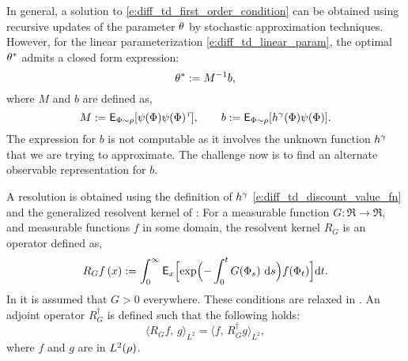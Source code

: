 In general, a solution to \eqref{e:diff_td_first_order_condition} can be obtained using recursive updates of the parameter $\theta$ by stochastic approximation techniques. However, for the linear parameterization \eqref{e:diff_td_linear_param}, the optimal $\theta^*$ admits a closed form expression:
\begin{equation}
\param^* := M^{-1} b,
\label{e:diff_td_param_opt_lstd}
\end{equation}
where $M$ and $b$ are defined as,
\begin{equation}
M: = \Expect_{\markovstate \sim \pr} [\basis(\markovstate) \basis(\markovstate)^\transpose], \qquad b:= \Expect_{\markovstate \sim \pr} [h^\discount(\markovstate) \basis(\markovstate)].
\label{e:diff_td_lstd_M_b}
\end{equation}
The expression for $b$ is not computable as it involves the unknown function $h^\gamma$ that we are trying to approximate. The challenge now is to find an alternate observable representation for $b$. 

A resolution is obtained using the definition of $h^\gamma$ \eqref{e:diff_td_discount_value_fn} and the generalized resolvent kernel of \cite{nev72,meytwe93e,devkonmey17a}: For a measurable function $G\colon\Re\to\Re$, and measurable functions $f$ in some domain, the resolvent kernel $R_G$ is an operator defined as,
\begin{equation}
R_G f\, (x) := \int_0^\infty \Expect_x\Bigl[ \exp\Bigl(-\int_0^t G(\markovstate_s)\, \rmd s \Bigr) f(\markovstate_t)\Bigr] \ud t.
\label{e:diff_td_resolvent_neveu}
\end{equation}
In  \cite{nev72,meytwe93e} it is assumed that $G>0$ everywhere. These conditions are relaxed in \cite{konmey03a,devkonmey17a}. An adjoint operator $R^\dagger_G$ is defined such that the following holds:
\begin{equation}
\langle R_G f,\, g \rangle_{L^2} = \langle f ,\, R^\dagger_G g \rangle_{L^2}, 
\label{e:diff_td_resolvent_adjoint}
\end{equation}
where $f$ and $g$ are in $L^2(\rho)$. 

